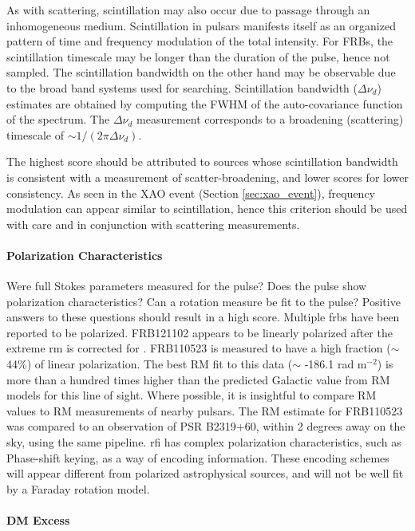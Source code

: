 \documentclass[a4paper,fleqn,usenatbib]{mnras}
\begin{document}
As with scattering, scintillation may also occur due to passage through an
inhomogeneous medium. Scintillation in pulsars manifests itself as an organized
pattern of time and frequency modulation of the total intensity. For FRBs, the
scintillation timescale may be longer than the duration of the pulse, hence not
sampled. The scintillation bandwidth on the other hand may be observable due to
the broad band systems used for searching.  Scintillation bandwidth ($\Delta
\nu_d$) estimates are obtained by computing the FWHM of the auto-covariance
function of the spectrum.  The $\Delta \nu_d$ measurement corresponds to a
broadening (scattering) timescale of $\sim 1/(2\pi\Delta \nu_d)$.  

The highest score should be attributed to sources whose scintillation bandwidth
is consistent with a measurement of scatter-broadening, and lower scores for
lower consistency. As seen in the XAO event (Section \ref{sec:xao_event}),
frequency modulation can appear similar to scintillation, hence this criterion
should be used with care and in conjunction with scattering measurements. 

\paragraph{Polarization Characteristics}

Were full Stokes parameters measured for the pulse? Does the pulse show
polarization characteristics? Can a rotation measure be fit to the pulse?
Positive answers to these questions should result in a high score.  Multiple
\glspl{frb} have been reported to be polarized.  FRB121102 appears to be
linearly polarized after the extreme \gls{rm} is corrected for
\citep{2018Natur.553..182M}. FRB110523 is measured to have a high fraction
($\sim$ 44\%) of linear polarization. The best RM fit to this data ($\sim$
-186.1 rad m$^{-2}$) is more than a hundred times higher than the predicted
Galactic value from RM models for this line of sight. Where possible, it is
insightful to compare RM values to RM measurements of nearby pulsars. The RM
estimate for FRB110523 was compared to an observation of PSR B2319+60, within
2 degrees away on the sky, using the same pipeline.  \gls{rfi} has complex
polarization characteristics, such as Phase-shift keying, as a way of encoding
information.  These encoding schemes will appear different from polarized
astrophysical sources, and will not be well fit by a Faraday rotation model.

\paragraph{DM Excess}
\end{document}
